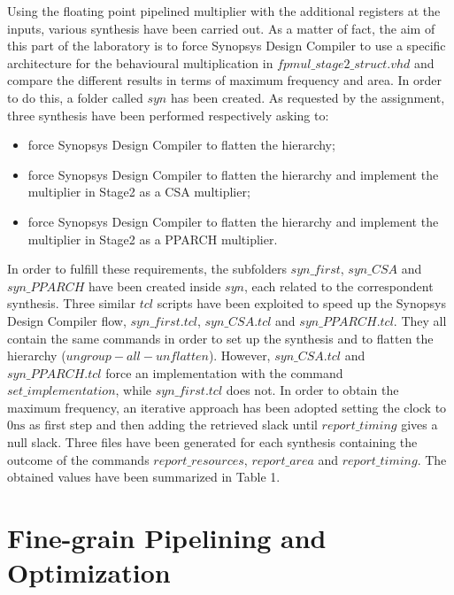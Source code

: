 Using the floating point pipelined multiplier with the additional registers at the inputs, various synthesis have been carried out. As a matter of fact, the aim of this part of the laboratory is to force Synopsys Design Compiler to use a specific architecture for the behavioural multiplication in $fpmul\_stage2\_struct.vhd$ and compare the different results in terms of maximum frequency and area.
In order to do this, a folder called $syn$ has been created. As requested by the assignment, three synthesis have been performed respectively asking to:

\begin{itemize}
\item force Synopsys Design Compiler to flatten the hierarchy;
\item force Synopsys Design Compiler to flatten the hierarchy and implement the multiplier in Stage2 as a CSA multiplier;
\item force Synopsys Design Compiler to flatten the hierarchy and implement the multiplier in Stage2 as a PPARCH multiplier.
\end{itemize}

\noindent In order to fulfill these requirements, the subfolders $syn\_first$, $syn\_CSA$ and $syn\_PPARCH$ have been created inside $syn$, each related to the correspondent synthesis. Three similar $tcl$ scripts have been exploited to speed up the Synopsys Design Compiler flow, $syn\_first.tcl$, $syn\_CSA.tcl$ and $syn\_PPARCH.tcl$. They all contain the same commands in order to set up the synthesis and to flatten the hierarchy ($ungroup  -all -unflatten$). However, $syn\_CSA.tcl$ and $syn\_PPARCH.tcl$ force an implementation with the command $set\_implementation$, while $syn\_first.tcl$ does not.
In order to obtain the maximum frequency, an iterative approach has been adopted setting the clock to $0\si{\nano\second}$ as first step and then adding the retrieved slack until $report\_timing$ gives a null slack. Three files have been generated for each synthesis containing the outcome of the commands $report\_resources$, $report\_area$ and $report\_timing$. The obtained values have been summarized in Table 1.


\section{Fine-grain Pipelining and Optimization}

